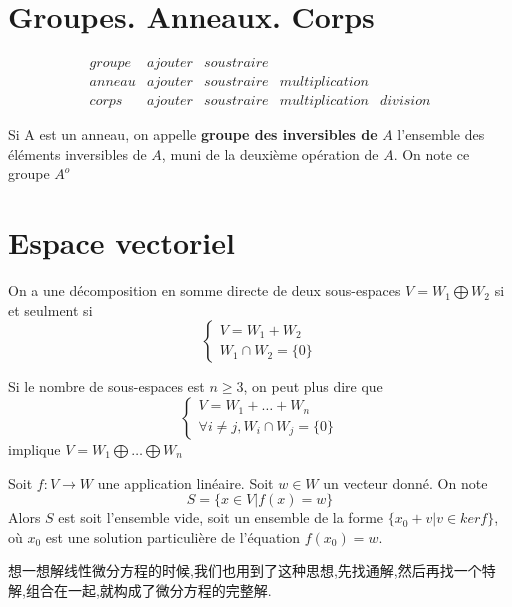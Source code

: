\documentclass{book}
\begin{document}
\chapter{Groupes. Anneaux. Corps}
$$
\begin{array}{l|llll}
groupe & ajouter & soustraire &&\\
\hline
anneau & ajouter & soustraire & multiplication & \\
\hline
corps & ajouter & soustraire & multiplication & division
\end{array}
$$


Si A est un anneau, on appelle  {\bf groupe des inversibles de} $A$ l'ensemble des \'el\'ements inversibles de $A$, muni de la deuxi\`eme op\'eration de $A$.
On note ce groupe $A^o$

\chapter{Espace vectoriel}
\begin{theorem}
  On a une d\'ecomposition en somme directe de deux sous-espaces $ V = W_1 \bigoplus W_2$  si et seulment si
  $$
    \begin{cases}
    V=W_1+W_2 \\
    W_1\cap W_2=\{0\}
    \end{cases}
  $$
\end{theorem}
\begin{attention}
  Si le nombre de sous-espaces est $n\geqslant 3$, on peut plus dire que
  $$
    \begin{cases}
    V=W_1+\dots+W_n \\
    \forall i \neq j,W_i\cap W_j=\{0\}
    \end{cases}
  $$
  implique $ V = W_1 \bigoplus \dots \bigoplus W_n$
\end{attention}

\begin{theorem}
  Soit $f:V \rightarrow W$ une application lin\'eaire. Soit $w \in W$ un vecteur donn\'e. On note
  $$
  S=\{x \in V|f(x)=w\}
  $$
  Alors $S$ est soit l'ensemble vide, soit un ensemble de la forme $\{x_0+v|v \in ker f\}$, o\`u $x_0$ est une solution particuli\`ere de l'\'equation $f(x_0)=w$.
\end{theorem}
\begin{note}
  想一想解线性微分方程的时候,我们也用到了这种思想,先找通解,然后再找一个特解,组合在一起,就构成了微分方程的完整解.
\end{note}
\end{document}

